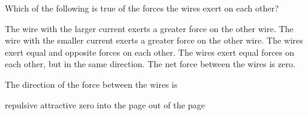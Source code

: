 \documentclass{../../oss-apphys-exam}
\begin{document}
\begin{multicols*}{2}
\begin{questions}
%    


    \question Which of the following is true of the forces the wires exert on
    each other?
    \begin{choices}
      \choice The wire with the larger current exerts a greater force on the
      other wire.
      \choice The wire with the smaller current exerts a greater force on the
      other wire.
      \choice The wires exert equal and opposite forces on each other.
      \choice The wires exert equal forces on each other, but in the same
      direction.
      \choice The net force between the wires is zero.
    \end{choices}
    \label{q:2curr1}
    \vspace{.7in}
    
    \question The direction of the force between the wires is
    \begin{choices}
      \choice repulsive
      \choice attractive
      \choice zero
      \choice into the page
      \choice out of the page
    \end{choices}
    \label{q:2curr2}
    \vspace{.7in}
    

\end{questions}
\end{multicols*}
\end{document}
